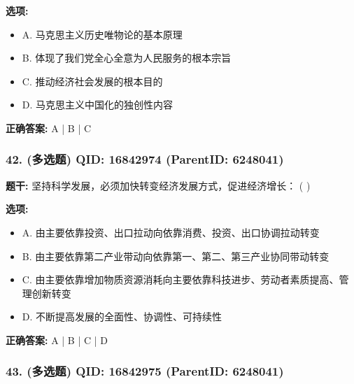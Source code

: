 \documentclass[12pt,UTF8]{ctexart}
\begin{document}
\textbf{选项:}
\begin{itemize}[leftmargin=*]

  \item A. 马克思主义历史唯物论的基本原理

  \item B. 体现了我们党全心全意为人民服务的根本宗旨

  \item C. 推动经济社会发展的根本目的

  \item D. 马克思主义中国化的独创性内容

\end{itemize}

\textbf{正确答案:}
A | B | C

\vspace{0.3em}\hrulefill\vspace{0.7em}

\subsubsection*{42. (多选题) \small QID: 16842974 (ParentID: 6248041)}

\textbf{题干:}
坚持科学发展，必须加快转变经济发展方式，促进经济增长： ( )



\textbf{选项:}
\begin{itemize}[leftmargin=*]

  \item A. 由主要依靠投资、出口拉动向依靠消费、投资、出口协调拉动转变

  \item B. 由主要依靠第二产业带动向依靠第一、第二、第三产业协同带动转变

  \item C. 由主要依靠增加物质资源消耗向主要依靠科技进步、劳动者素质提高、管理创新转变

  \item D. 不断提高发展的全面性、协调性、可持续性

\end{itemize}

\textbf{正确答案:}
A | B | C | D

\vspace{0.3em}\hrulefill\vspace{0.7em}

\subsubsection*{43. (多选题) \small QID: 16842975 (ParentID: 6248041)}
\end{document}

